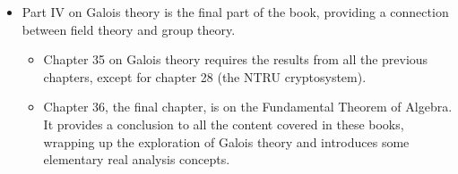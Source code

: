 \begin{itemize}
\begin{itemize}
    \end{itemize}
    \item Part IV on Galois theory is the final part of the book, providing a connection between field theory and group theory.
    \begin{itemize}
        \item Chapter 35 on Galois theory requires the results from all the previous chapters, except for chapter 28 (the NTRU cryptosystem).
        \item Chapter 36, the final chapter, is on the Fundamental Theorem of Algebra. It provides a conclusion to all the content covered in these books, wrapping up the exploration of Galois theory and introduces some elementary real analysis concepts.
    \end{itemize}
\end{itemize}
